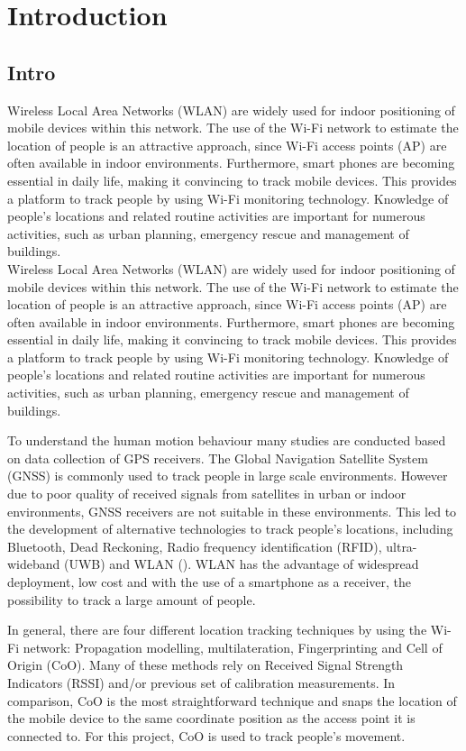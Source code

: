 \chapter{Introduction}\label{Introduction}
\section{Intro}\label{intro}
Wireless Local Area Networks (WLAN) are widely used for indoor positioning of mobile devices within this network. The use of the Wi-Fi network to estimate the location of people is an attractive approach, since Wi-Fi access points (AP) are often available in indoor environments. Furthermore, smart phones are becoming essential in daily life, making it convincing to track mobile devices. This provides a platform to track people by using Wi-Fi monitoring technology. Knowledge of people’s locations and related routine activities are important for numerous activities, such as urban planning, emergency rescue and management of buildings.\\
Wireless Local Area Networks (WLAN) are widely used for indoor positioning of mobile devices within this network. The use of the Wi-Fi network to estimate the location of people is an attractive approach, since Wi-Fi access points (AP) are often available in indoor environments. Furthermore, smart phones are becoming essential in daily life, making it convincing to track mobile devices. This provides a platform to track people by using Wi-Fi monitoring technology. Knowledge of people’s locations and related routine activities are important for numerous activities, such as urban planning, emergency rescue and management of buildings.

To understand the human motion behaviour many studies are conducted based on data collection of GPS receivers. The Global Navigation Satellite System (GNSS) is commonly used to track people in large scale environments. However due to poor quality of received signals from satellites in urban or indoor environments, GNSS receivers are not suitable in these environments. This led to the development of alternative technologies to track people’s locations, including Bluetooth, Dead Reckoning, Radio frequency identification (RFID), ultra-wideband (UWB) and WLAN (\cite{mautz2012indoor}). WLAN has the advantage of widespread deployment, low cost and with the use of a smartphone as a receiver, the possibility to track a large amount of people.  

In general, there are four different location tracking techniques by using the Wi-Fi network: Propagation modelling, multilateration, Fingerprinting and Cell of Origin (CoO). Many of these methods rely on Received Signal Strength Indicators (RSSI) and/or previous set of calibration measurements. In comparison, CoO is the most straightforward technique and snaps the location of the mobile device to the same coordinate position as the access point it is connected to. For this project, CoO is used to track people’s movement.

